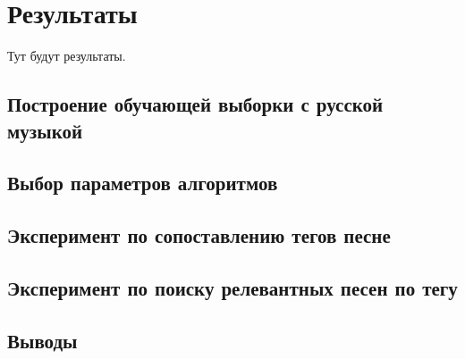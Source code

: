 \chapter{Результаты} 
\label{results}

Тут будут результаты.

\section{Построение обучающей выборки с русской музыкой}
\section{Выбор параметров алгоритмов}
\section{Эксперимент по сопоставлению тегов песне}
\section{Эксперимент по поиску релевантных песен по тегу}
\section{Выводы}